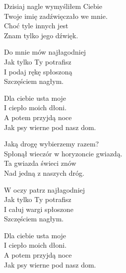 \begin{text}
    Dzisiaj nagle wymyśliłem Ciebie\\
    Twoje imię zadźwięczało we mnie.\\
    Choć tyle innych jest\\
    Znam tylko jego dźwięk.

    Do mnie mów najłagodniej\\
    Jak tylko Ty potrafisz\\
    I podaj rękę spłoszoną\\
    Szczęściem nagłym.

    Dla ciebie usta moje\\
    I ciepło moich dłoni.\\
    A potem przyjdą noce\\
    Jak psy wierne pod nasz dom.

    Jaką drogę wybierzemy razem?\\
    Spłonął wieczór w horyzoncie gwiazdą.\\
    Ta gwiazda świeci znów\\
    Nad jedną z naszych dróg.

    W oczy patrz najłagodniej\\
    Jak tylko Ty potrafisz\\
    I całuj wargi spłoszone\\
    Szczęściem nagłym.

    Dla ciebie usta moje\\
    I ciepło moich dłoni.\\
    A potem przyjdą noce\\
    Jak psy wierne pod nasz dom.
\end{text}
\begin{chord}

\end{chord}